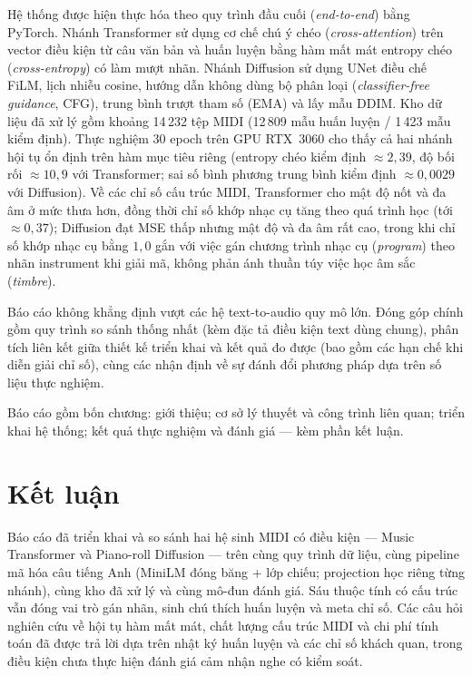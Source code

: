 \documentclass[oneside, a4paper, 12pt]{book}
\renewcommand{\thesection}{\arabic{chapter}.\arabic{section}}
\theoremstyle{plain}
\theoremstyle{definition}
\theoremstyle{remark}
\begin{document}
Hệ thống được hiện thực hóa theo quy trình đầu cuối (\textit{end-to-end}) bằng PyTorch. Nhánh Transformer sử dụng cơ chế chú ý chéo (\textit{cross-attention}) trên vector điều kiện từ câu văn bản và huấn luyện bằng hàm mất mát entropy chéo (\textit{cross-entropy}) có làm mượt nhãn. Nhánh Diffusion sử dụng UNet điều chế FiLM, lịch nhiễu cosine, hướng dẫn không dùng bộ phân loại (\textit{classifier-free guidance}, CFG), trung bình trượt tham số (EMA) và lấy mẫu DDIM. Kho dữ liệu đã xử lý gồm khoảng 14\,232 tệp MIDI (12\,809 mẫu huấn luyện / 1\,423 mẫu kiểm định). Thực nghiệm 30 epoch trên GPU RTX~3060 cho thấy cả hai nhánh hội tụ ổn định trên hàm mục tiêu riêng (entropy chéo kiểm định $\approx 2{,}39$, độ bối rối $\approx 10{,}9$ với Transformer; sai số bình phương trung bình kiểm định $\approx 0{,}0029$ với Diffusion). Về các chỉ số cấu trúc MIDI, Transformer cho mật độ nốt và đa âm ở mức thưa hơn, đồng thời chỉ số khớp nhạc cụ tăng theo quá trình học (tới $\approx 0{,}37$); Diffusion đạt MSE thấp nhưng mật độ và đa âm rất cao, trong khi chỉ số khớp nhạc cụ bằng $1{,}0$ gắn với việc gán chương trình nhạc cụ (\textit{program}) theo nhãn instrument khi giải mã, không phản ánh thuần túy việc học âm sắc (\textit{timbre}).

Báo cáo không khẳng định vượt các hệ text-to-audio quy mô lớn. Đóng góp chính gồm quy trình so sánh thống nhất (kèm đặc tả điều kiện text dùng chung), phân tích liên kết giữa thiết kế triển khai và kết quả đo được (bao gồm các hạn chế khi diễn giải chỉ số), cùng các nhận định về sự đánh đổi phương pháp dựa trên số liệu thực nghiệm.

Báo cáo gồm bốn chương: giới thiệu; cơ sở lý thuyết và công trình liên quan; triển khai hệ thống; kết quả thực nghiệm và đánh giá --- kèm phần kết luận.

\tableofcontents

\newpage

\thispagestyle{fancy}
\setcounter{page}{1}







\chapter*{Kết luận}
\setcounter{section}{0}
\renewcommand*{\thesection}{\the\value{section}}

Báo cáo đã triển khai và so sánh hai hệ sinh MIDI có điều kiện --- Music Transformer và Piano-roll Diffusion --- trên cùng quy trình dữ liệu, cùng pipeline mã hóa câu tiếng Anh (MiniLM đóng băng + lớp chiếu; projection học riêng từng nhánh), cùng kho đã xử lý và cùng mô-đun đánh giá. Sáu thuộc tính có cấu trúc vẫn đóng vai trò gán nhãn, sinh chú thích huấn luyện và meta chỉ số. Các câu hỏi nghiên cứu về hội tụ hàm mất mát, chất lượng cấu trúc MIDI và chi phí tính toán đã được trả lời dựa trên nhật ký huấn luyện và các chỉ số khách quan, trong điều kiện chưa thực hiện đánh giá cảm nhận nghe có kiểm soát.
\end{document}
